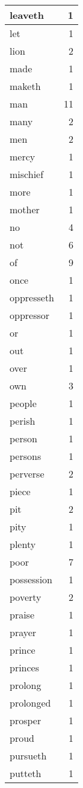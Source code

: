 \begin{center}
\begin{longtable}{l|r}
leaveth & 1\\ \hline 
let & 1\\ \hline 
lion & 2\\ \hline 
made & 1\\ \hline 
maketh & 1\\ \hline 
man & 11\\ \hline 
many & 2\\ \hline 
men & 2\\ \hline 
mercy & 1\\ \hline 
mischief & 1\\ \hline 
more & 1\\ \hline 
mother & 1\\ \hline 
no & 4\\ \hline 
not & 6\\ \hline 
of & 9\\ \hline 
once & 1\\ \hline 
oppresseth & 1\\ \hline 
oppressor & 1\\ \hline 
or & 1\\ \hline 
out & 1\\ \hline 
over & 1\\ \hline 
own & 3\\ \hline 
people & 1\\ \hline 
perish & 1\\ \hline 
person & 1\\ \hline 
persons & 1\\ \hline 
perverse & 2\\ \hline 
piece & 1\\ \hline 
pit & 2\\ \hline 
pity & 1\\ \hline 
plenty & 1\\ \hline 
poor & 7\\ \hline 
possession & 1\\ \hline 
poverty & 2\\ \hline 
praise & 1\\ \hline 
prayer & 1\\ \hline 
prince & 1\\ \hline 
princes & 1\\ \hline 
prolong & 1\\ \hline 
prolonged & 1\\ \hline 
prosper & 1\\ \hline 
proud & 1\\ \hline 
pursueth & 1\\ \hline 
putteth & 1\\ \hline 

\end{longtable}
\end{center}
